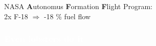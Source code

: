 \documentclass[12pt,svgnames,table,draft=false]{beamer}
\begin{document}
\begin{frame}{}

\vspace{-8em}
\centering
\begin{tcolorbox}[width=.8\textwidth,colback={gray!10!}]  
\centering
NASA \textbf{A}utonomus \textbf{F}ormation \textbf{F}light Program: \\
2x F-18 $\Rightarrow$ -18 \% fuel flow  
\end{tcolorbox}  

\end{frame}

\begin{frame}\frametitle{\textcolor{white}{Even lobsters do it}}
\end{frame}

\end{document}
